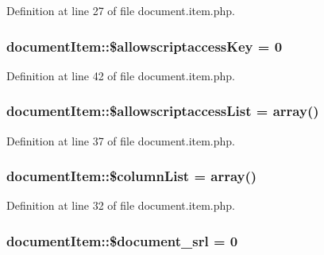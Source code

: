 Definition at line 27 of file document.\+item.\+php.

\subsubsection[{\texorpdfstring{\$allowscriptaccess\+Key}{$allowscriptaccessKey}}]{\setlength{\rightskip}{0pt plus 5cm}document\+Item\+::\$allowscriptaccess\+Key = 0}\hypertarget{classdocumentItem_ab4273ebe05df985235bf651d918bd4f8}{}\label{classdocumentItem_ab4273ebe05df985235bf651d918bd4f8}


Definition at line 42 of file document.\+item.\+php.

\subsubsection[{\texorpdfstring{\$allowscriptaccess\+List}{$allowscriptaccessList}}]{\setlength{\rightskip}{0pt plus 5cm}document\+Item\+::\$allowscriptaccess\+List = array()}\hypertarget{classdocumentItem_a3b10cc840f3a20580d3ab2269ef24df3}{}\label{classdocumentItem_a3b10cc840f3a20580d3ab2269ef24df3}


Definition at line 37 of file document.\+item.\+php.

\subsubsection[{\texorpdfstring{\$column\+List}{$columnList}}]{\setlength{\rightskip}{0pt plus 5cm}document\+Item\+::\$column\+List = array()}\hypertarget{classdocumentItem_a244e1382304e15c5ae29e3311ef8e865}{}\label{classdocumentItem_a244e1382304e15c5ae29e3311ef8e865}


Definition at line 32 of file document.\+item.\+php.

\subsubsection[{\texorpdfstring{\$document\+\_\+srl}{$document_srl}}]{\setlength{\rightskip}{0pt plus 5cm}document\+Item\+::\$document\+\_\+srl = 0}\hypertarget{classdocumentItem_a87159d1cf24944d081646e6fe4f7e0f6}{}\label{classdocumentItem_a87159d1cf24944d081646e6fe4f7e0f6}


